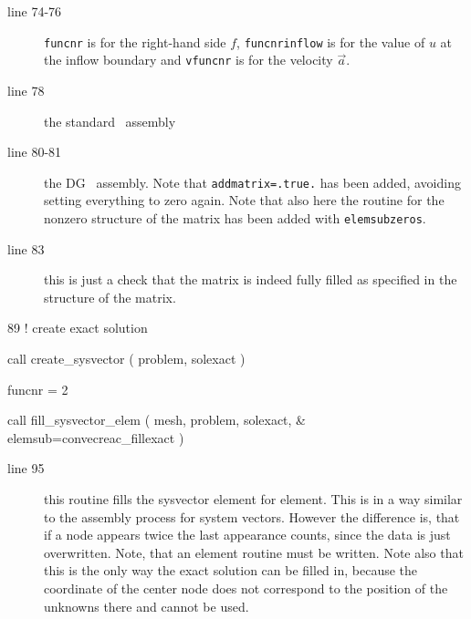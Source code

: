 \begin{description}
   \item[line 74-76] \texttt{funcnr} is for the right-hand side $f$,
     \texttt{funcnrinflow} is for the value of $u$ at the inflow boundary and
     \texttt{vfuncnr} is for the velocity $\vec a$.
   \item[line 78] the standard \fem\ assembly
   \item[line 80-81] the DG \fem\ assembly. Note that \texttt{addmatrix=.true.}
    has been added, avoiding setting everything to zero again. Note that also
    here the routine for the nonzero structure of the matrix has been added with
    \texttt{elemsubzeros}.
   \item[line 83] this is just a check that the matrix is indeed fully filled
      as specified in the structure of the matrix.
\end{description}

\begin{listing}{89}
! create exact solution
                                                                                
  call create_sysvector ( problem, solexact )
                                                                                
  funcnr = 2
                                                                                
  call fill_sysvector_elem ( mesh, problem, solexact, &
    elemsub=convecreac_fillexact )
                                                                                
\end{listing}

\begin{description}
   \item[line 95] this routine fills the sysvector element for element.
 This is 
 in a way similar to the assembly process for system vectors.
 However the difference is,
 that if a node appears twice the last appearance counts, since the data is just
 overwritten. Note, that an element routine must be written. Note also that
 this is the only way the exact solution can be filled in, because the
coordinate of the center node does not correspond to
 the position of the unknowns there and  cannot be used.
\end{description}

